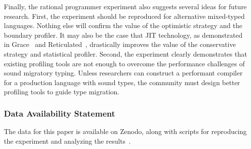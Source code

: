 Finally, the rational programmer experiment also suggests several ideas for
future research. First, the experiment should be reproduced for alternative
mixed-typed languages. Nothing else will confirm the value of the optimistic
strategy and the boundary profiler.
It may also be the case that JIT technology, as demonstrated
in Grace~\cite{rmhn-ecoop-2019} and Reticulated~\cite{vsc-dls-2019}, drastically improves the value
of the conservative strategy and statistical profiler.
Second, the
experiment clearly demonstrates that existing profiling tools are not enough to
overcome the performance challenges of sound migratory typing. Unless researchers
can construct a performant compiler for a production language with sound
types, the community must design better profiling tools to guide
type migration.










\subsubsection*{Data Availability Statement}

The data for this paper is available on Zenodo,
along with scripts for reproducing the experiment
and analyzing the results~\cite{gdf-artifact-2023}.

